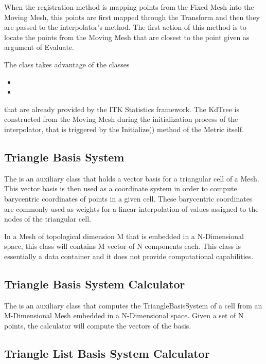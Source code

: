 \documentclass{InsightArticle}
\begin{document}
When the registration method is mapping points from the Fixed Mesh into the
Moving Mesh, this points are first mapped through the Transform and then they
are passed to the interpolator's  method. The first action of
this method is to locate the points from the Moving Mesh that are closest to
the point given as argument of Evaluate.

The  class takes advantage of the classes

\begin{itemize}
\item {}
\item {} 
\end{itemize}

that are already provided by the ITK Statistics framework. The KdTree is
constructed from the Moving Mesh during the initialization process of the
interpolator, that is triggered by the Initialize() method of the Metric
itself.

\subsection{Triangle Basis System}

The  is an auxiliary class that holds a vector basis
for a triangular cell of a Mesh. This vector basis is then used as a coordinate
system in order to compute barycentric coordinates of points in a given cell.
These barycentric coordinates are commonly used as weights for a linear
interpolation of values assigned to the nodes of the triangular cell.

In a Mesh of topological dimension M that is embedded in a N-Dimensional space,
this class will contains M vector of N components each. This class is
essentially a data container and it does not provide computational
capabilities.

\subsection{Triangle Basis System Calculator}

The  is an auxiliary class that computes
the TriangleBasisSystem of a cell from an M-Dimensional Mesh embedded in a
N-Dimensional space.  Given a set of N points, the calculator will compute the
vectors of the basis.

\subsection{Triangle List Basis System Calculator}
\end{document}
